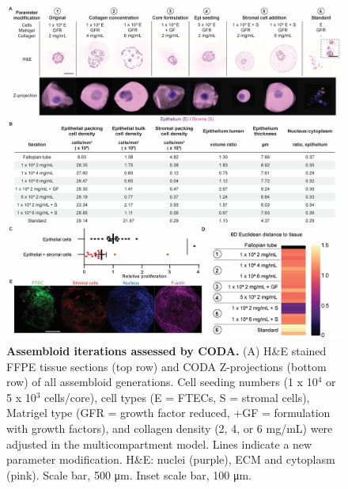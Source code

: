 \begin{refsection}
    \begin{figure}[p]
        \begin{center}
            \includegraphics[width=1\textwidth,height=0.85\textheight,keepaspectratio,clip,page=1]{figures/chapter4/fig_S6.jpg}
            \captionsetup{font=small}
            \caption{\textbf{Assembloid iterations assessed by CODA.} (A) H\&E stained FFPE tissue sections (top row) and CODA Z-projections (bottom row) of all assembloid generations. Cell seeding numbers (1 x 10$^4$ or 5 x 10$^3$ cells/core), cell types (E = FTECs, S = stromal cells), Matrigel type (GFR = growth factor reduced, +GF = formulation with growth factors), and collagen density (2, 4, or 6 mg/mL) were adjusted in the multicompartment model. Lines indicate a new parameter modification. H\&E: nuclei (purple), ECM and cytoplasm (pink). Scale bar, 500 μm. Inset scale bar, 100 μm. }
            \label{chapter4_figS6}
        \end{center}
    \end{figure}
    

\end{refsection}
